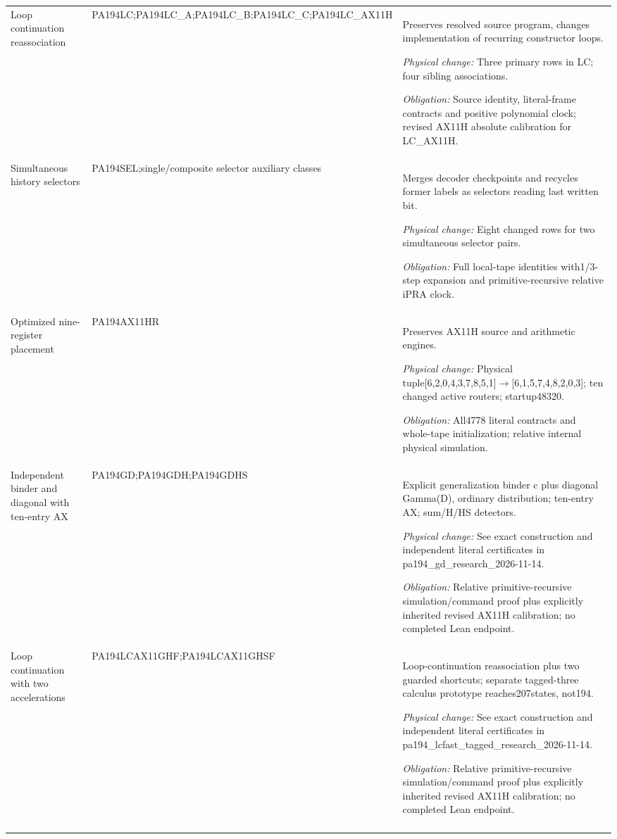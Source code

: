 {\begin{longtable}{@{}>{\raggedright\arraybackslash}p{}>{\raggedright\arraybackslash}p{}>{\raggedright\arraybackslash}p{}@{}}
Loop continuation reassociation & PA194LC;\allowbreak PA194LC\_A;\allowbreak PA194LC\_B;\allowbreak PA194LC\_C;\allowbreak PA194LC\_AX11H & Preserves resolved source program, changes implementation of recurring constructor loops.\par\emph{Physical change:} Three primary rows in LC; four sibling associations.\par\emph{Obligation:} Source identity, literal-frame contracts and positive polynomial clock; revised AX11H absolute calibration for LC\_AX11H.\\\addlinespace
Simultaneous history selectors & PA194SEL;\allowbreak single/composite selector auxiliary classes & Merges decoder checkpoints and recycles former labels as selectors reading last written bit.\par\emph{Physical change:} Eight changed rows for two simultaneous selector pairs.\par\emph{Obligation:} Full local-tape identities with1/3-step expansion and primitive-recursive relative iPRA clock.\\\addlinespace
Optimized nine-register placement & PA194AX11HR & Preserves AX11H source and arithmetic engines.\par\emph{Physical change:} Physical tuple[6,2,0,4,3,7,8,5,1]\(\to\)[6,1,5,7,4,8,2,0,3]; ten changed active routers; startup48320.\par\emph{Obligation:} All4778 literal contracts and whole-tape initialization; relative internal physical simulation.\\\addlinespace
Independent binder and diagonal with ten-entry AX & PA194GD;\allowbreak PA194GDH;\allowbreak PA194GDHS & Explicit generalization binder c plus diagonal Gamma(D), ordinary distribution; ten-entry AX; sum/H/HS detectors.\par\emph{Physical change:} See exact construction and independent literal certificates in pa194\_gd\_research\_2026-11-14.\par\emph{Obligation:} Relative primitive-recursive simulation/command proof plus explicitly inherited revised AX11H calibration; no completed Lean endpoint.\\\addlinespace
Loop continuation with two accelerations & PA194LCAX11GHF;\allowbreak PA194LCAX11GHSF & Loop-continuation reassociation plus two guarded shortcuts; separate tagged-three calculus prototype reaches207states, not194.\par\emph{Physical change:} See exact construction and independent literal certificates in pa194\_lcfast\_tagged\_research\_2026-11-14.\par\emph{Obligation:} Relative primitive-recursive simulation/command proof plus explicitly inherited revised AX11H calibration; no completed Lean endpoint.\\\addlinespace

\end{longtable}}
